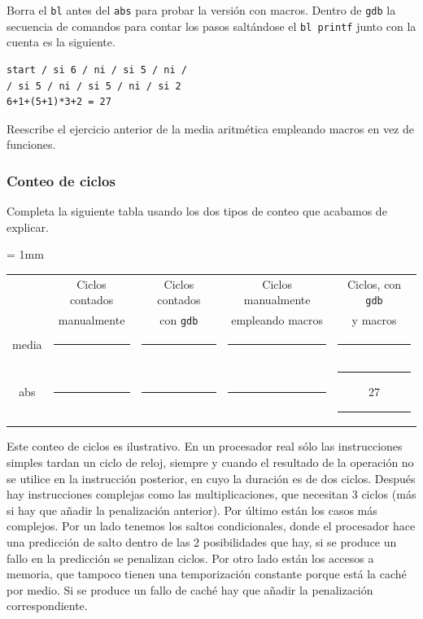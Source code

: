 Borra el {\tt bl} antes del {\tt abs} para probar la versión con macros. Dentro de 
{\tt gdb} la secuencia de comandos para contar los pasos saltándose el
{\tt bl printf} junto con la cuenta es la siguiente.

\begin{lstlisting}
start / si 6 / ni / si 5 / ni /
/ si 5 / ni / si 5 / ni / si 2
6+1+(5+1)*3+2 = 27
\end{lstlisting}

Reescribe el ejercicio anterior de la media aritmética empleando macros en vez de
funciones.

\subsubsection{Conteo de ciclos}

Completa la siguiente tabla usando los dos tipos de conteo que acabamos de explicar.

\begin{center}
\small
\colorbox[gray]{0.9}{
\tabcolsep = 1mm
\begin{tabular}{ccccc}
&Ciclos contados & Ciclos contados & Ciclos manualmente & Ciclos, con {\tt gdb} \\
&manualmente & con {\tt gdb}       & empleando macros & y macros \\
media &
\colorbox[gray]{1}{\rule{0cm}{0.46cm}\rule{2.6cm}{0cm}} &
\colorbox[gray]{1}{\rule{0cm}{0.46cm}\rule{2.6cm}{0cm}} &
\colorbox[gray]{1}{\rule{0cm}{0.46cm}\rule{2.6cm}{0cm}} &
\colorbox[gray]{1}{\rule{0cm}{0.46cm}\rule{2.6cm}{0cm}} \\[1mm]
abs &
\colorbox[gray]{1}{\rule{0cm}{0.46cm}\rule{2.6cm}{0cm}} &
\colorbox[gray]{1}{\rule{0cm}{0.46cm}\rule{2.6cm}{0cm}} &
\colorbox[gray]{1}{\rule{0cm}{0.46cm}\rule{2.6cm}{0cm}} &
\colorbox[gray]{1}{\rule{0cm}{0.46cm}\rule{1.1cm}{0cm}27\rule{1.1cm}{0cm}} \\
\end{tabular}
\vspace{0.5ex}
}
\end{center}

Este conteo de ciclos es ilustrativo. En un procesador real sólo
las instrucciones simples tardan un ciclo de reloj, siempre y cuando
el resultado de la operación no se utilice en la instrucción posterior,
en cuyo la duración es de dos ciclos. Después hay instrucciones
complejas como las multiplicaciones, que necesitan 3 ciclos (más si hay
que añadir la penalización anterior). Por último están los casos 
más complejos. Por un lado tenemos los saltos condicionales, donde el
procesador hace una predicción de salto dentro de las 2 posibilidades
que hay, si se produce un fallo en la predicción se penalizan ciclos.
Por otro lado están los accesos a memoria, que tampoco tienen una
temporización constante porque está la caché por medio. Si se produce
un fallo de caché hay que añadir la penalización correspondiente.

